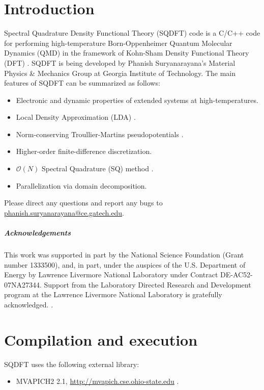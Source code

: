 \documentclass[12pt]{report}
\begin{document}
\chapter{Introduction}
Spectral Quadrature Density Functional Theory (SQDFT) code is a C/C++ code for performing high-temperature Born-Oppenheimer Quantum Molecular Dynamics (QMD) in the framework of Kohn-Sham Density Functional Theory (DFT) \cite{Hohenberg,Kohn1965}. SQDFT is being developed by Phanish Suryanarayana's Material Physics \& Mechanics Group at Georgia Institute of Technology. The main features of SQDFT can be summarized as follows:
\begin{itemize}
\item Electronic and dynamic properties of extended systems at high-temperatures.
\item Local Density Approximation (LDA) \cite{Kohn1965}.
\item Norm-conserving Troullier-Martins pseudopotentials \cite{Troullier}.
\item Higher-order finite-difference discretization. 
\item $\mathcal{O}(N)$ Spectral Quadrature (SQ) method \cite{suryanarayana2013spectral,pratapa2015spectral}. 
\item Parallelization via domain decomposition.
\end{itemize}
Please direct any questions and report any bugs to \href{mailto:phanish.suryanarayana@ce.gatech.edu}{phanish.suryanarayana@ce.gatech.edu}. \\ 
\paragraph{Acknowledgements} This work was supported in part by the National Science Foundation (Grant number 1333500), and, in part, under the auspices of the U.S. Department of Energy by Lawrence Livermore National Laboratory under Contract DE-AC52-07NA27344. Support from the Laboratory Directed Research and Development program at the Lawrence Livermore National Laboratory is gratefully acknowledged. .

\chapter{Compilation and execution}
SQDFT uses the following external library:
\begin{itemize}
\item MVAPICH2 2.1, \url{http://mvapich.cse.ohio-state.edu} .
\end{itemize}
\vspace{-4mm}
\end{document}
